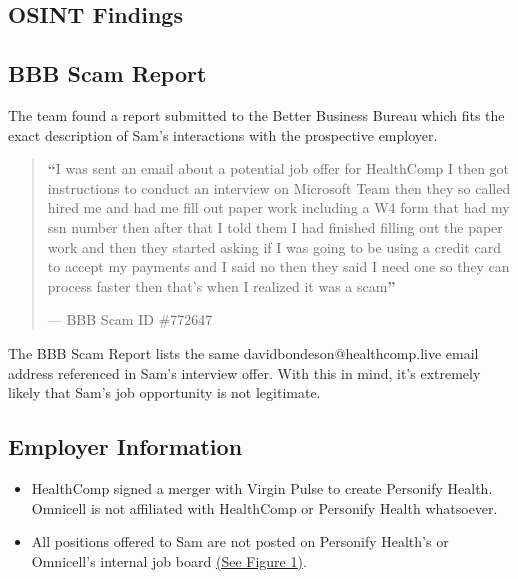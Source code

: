 \begin{fullwidth}
\section{OSINT Findings} %
\subsection{BBB Scam Report}

The team found a report submitted to the Better Business Bureau which fits the exact description of Sam's interactions with the prospective employer.

\begin{quote}
	\textbf{\LARGE ``}I was sent an email about a potential job offer for HealthComp I then got instructions to conduct an interview on Microsoft Team then they so called hired me and had me fill out paper work including a W4 form that had my ssn number then after that I told them I had finished filling out the paper work and then they started asking if I was going to be using a credit card to accept my payments and I said no then they said I need one so they can process faster then that's when I realized it was a scam\textbf{''}
	
	\hfill--- BBB Scam ID \#772647 \autocite{BBB:2023}
\end{quote}

The BBB Scam Report lists the same davidbondeson@healthcomp.live email address referenced in Sam's interview offer. With this in mind, it's extremely likely that Sam's job opportunity is not legitimate.

\subsection{Employer Information}
    \begin{itemize}
        \item HealthComp signed a merger with Virgin Pulse to create Personify Health. Omnicell is not affiliated with HealthComp or Personify Health whatsoever.
    \\\medskip
        \item All positions offered to Sam are not posted on Personify Health's or Omnicell's internal job board \hyperref[sec:Fig1]{(See Figure 1)}.
    \\\medskip
    \end{itemize}


\end{fullwidth}
